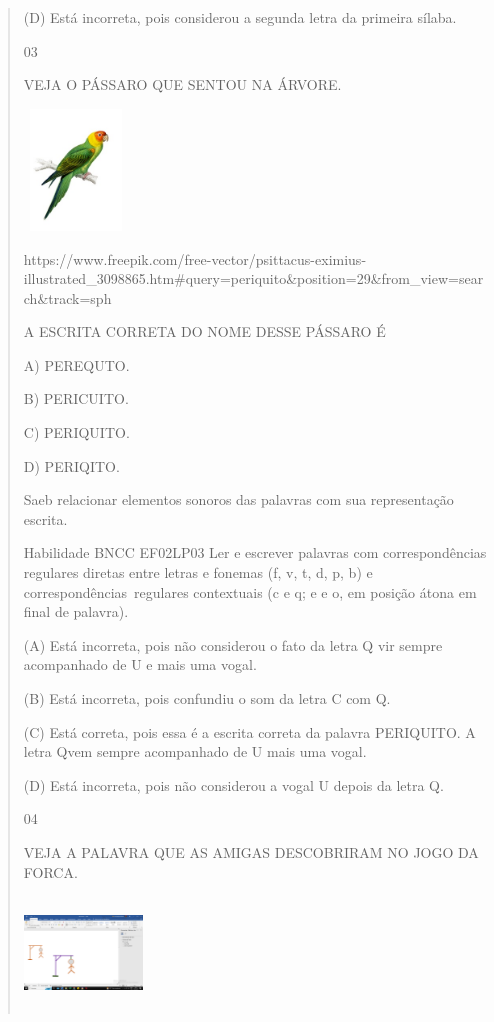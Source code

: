 \begin{verse}
{{{{{{{{{{{{{{{{{{{{(D) Está incorreta, pois considerou a segunda letra da primeira sílaba.

\num{03}

VEJA O PÁSSARO QUE SENTOU NA ÁRVORE.

\includegraphics[width=1.08542in,height=1.27222in]{media/image165.jpeg}

https://www.freepik.com/free-vector/psittacus-eximius-illustrated\_3098865.htm\#query=periquito\&position=29\&from\_view=search\&track=sph

A ESCRITA CORRETA DO NOME DESSE PÁSSARO É

A) PEREQUTO.

B) PERICUITO.

C) PERIQUITO.

D) PERIQITO.

Saeb relacionar elementos sonoros das palavras com sua representação
escrita.

Habilidade BNCC EF02LP03 Ler e escrever palavras com correspondências
regulares diretas entre letras e fonemas (f, v, t, d, p, b) e
correspondências~regulares contextuais (c e q; e e o, em posição átona
em final de palavra).

(A) Está incorreta, pois não considerou o fato da letra Q vir sempre
acompanhado de U e mais uma vogal.

(B) Está incorreta, pois confundiu o som da letra C com Q.

(C) Está correta, pois essa é a escrita correta da palavra PERIQUITO. A
letra Qvem sempre acompanhado de U mais uma vogal.

(D) Está incorreta, pois não considerou a vogal U depois da letra Q.

\num{04}

VEJA A PALAVRA QUE AS AMIGAS DESCOBRIRAM NO JOGO DA FORCA.

\includegraphics[width=1.24236in,height=1.17500in]{media/image166.png}

}}}}}}}}}}}}}}}}}}}}
\end{verse}
